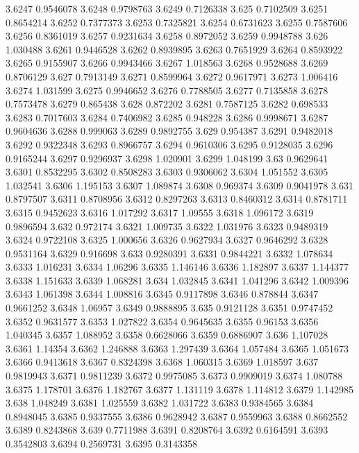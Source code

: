 3.6247  0.9546078
3.6248  0.9798763
3.6249  0.7126338
3.625  0.7102509
3.6251  0.8654214
3.6252  0.7377373
3.6253  0.7325821
3.6254  0.6731623
3.6255  0.7587606
3.6256  0.8361019
3.6257  0.9231634
3.6258  0.8972052
3.6259  0.9948788
3.626  1.030488
3.6261  0.9446528
3.6262  0.8939895
3.6263  0.7651929
3.6264  0.8593922
3.6265  0.9155907
3.6266  0.9943466
3.6267  1.018563
3.6268  0.9528688
3.6269  0.8706129
3.627  0.7913149
3.6271  0.8599964
3.6272  0.9617971
3.6273  1.006416
3.6274  1.031599
3.6275  0.9946652
3.6276  0.7788505
3.6277  0.7135858
3.6278  0.7573478
3.6279  0.865438
3.628  0.872202
3.6281  0.7587125
3.6282  0.698533
3.6283  0.7017603
3.6284  0.7406982
3.6285  0.948228
3.6286  0.9998671
3.6287  0.9604636
3.6288  0.999063
3.6289  0.9892755
3.629  0.954387
3.6291  0.9482018
3.6292  0.9322348
3.6293  0.8966757
3.6294  0.9610306
3.6295  0.9128035
3.6296  0.9165244
3.6297  0.9296937
3.6298  1.020901
3.6299  1.048199
3.63  0.9629641
3.6301  0.8532295
3.6302  0.8508283
3.6303  0.9306062
3.6304  1.051552
3.6305  1.032541
3.6306  1.195153
3.6307  1.089874
3.6308  0.969374
3.6309  0.9041978
3.631  0.8797507
3.6311  0.8708956
3.6312  0.8297263
3.6313  0.8460312
3.6314  0.8781711
3.6315  0.9452623
3.6316  1.017292
3.6317  1.09555
3.6318  1.096172
3.6319  0.9896594
3.632  0.972174
3.6321  1.009735
3.6322  1.031976
3.6323  0.9489319
3.6324  0.9722108
3.6325  1.000656
3.6326  0.9627934
3.6327  0.9646292
3.6328  0.9531164
3.6329  0.916698
3.633  0.9280391
3.6331  0.9844221
3.6332  1.078634
3.6333  1.016231
3.6334  1.06296
3.6335  1.146146
3.6336  1.182897
3.6337  1.144377
3.6338  1.151633
3.6339  1.068281
3.634  1.032845
3.6341  1.041296
3.6342  1.009396
3.6343  1.061398
3.6344  1.008816
3.6345  0.9117898
3.6346  0.878844
3.6347  0.9661252
3.6348  1.06957
3.6349  0.9888895
3.635  0.9121128
3.6351  0.9747452
3.6352  0.9631577
3.6353  1.027822
3.6354  0.9645635
3.6355  0.96153
3.6356  1.040345
3.6357  1.088952
3.6358  0.6628066
3.6359  0.6886907
3.636  1.107028
3.6361  1.14354
3.6362  1.246888
3.6363  1.297439
3.6364  1.057484
3.6365  1.051673
3.6366  0.9413618
3.6367  0.8324398
3.6368  1.060315
3.6369  1.018597
3.637  0.9819943
3.6371  0.9811239
3.6372  0.9975085
3.6373  0.9909019
3.6374  1.080788
3.6375  1.178701
3.6376  1.182767
3.6377  1.131119
3.6378  1.114812
3.6379  1.142985
3.638  1.048249
3.6381  1.025559
3.6382  1.031722
3.6383  0.9384565
3.6384  0.8948045
3.6385  0.9337555
3.6386  0.9628942
3.6387  0.9559963
3.6388  0.8662552
3.6389  0.8243868
3.639  0.7711988
3.6391  0.8208764
3.6392  0.6164591
3.6393  0.3542803
3.6394  0.2569731
3.6395  0.3143358

